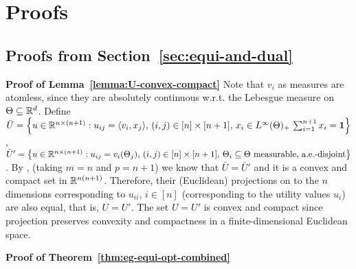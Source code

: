 
\section{Proofs} \label{app:proofs}

\subsection{Proofs from Section~\ref{sec:equi-and-dual}}
	\noindent\textbf{Proof of Lemma~\ref{lemma:U-convex-compact}}
	Note that $v_i$ as measures are atomless, since they are absolutely continuous w.r.t. the Lebesgue measure on $\Theta\subseteq \mathbb{R}^d$.
	Define\\
	$\bar{U} = \left\{ u \in \mathbb{R}^{n\times (n+1)}: u_{ij} = \langle v_i, x_j\rangle,\, (i,j)\in [n]\times [n+1],\, x_i \in L^\infty(\Theta)_+\, \sum_{i=1}^{n+1} x_i = \mathbf{1} \right\}$, \\
	$ \bar{U}' = \left\{ u \in \mathbb{R}^{n\times (n+1)}: u_{ij} = v_i(\Theta_j),\, (i,j)\in [n]\times [n+1],\, \textnormal{$\Theta_i\subseteq \Theta$ measurable, a.e.-disjoint}\right\}$.
	By \citet[Theorems 1 and 4]{dvoretzky1951relations}, (taking $m=n$ and $p=n+1$) we know that $\bar{U} = \bar{U}'$ and it is a convex and compact set in $\mathbb{R}^{n(n+1)}$.
	Therefore, their (Euclidean) projections on to the $n$ dimensions corresponding to $u_{ii}$, $i\in [n]$ (corresponding to the utility values $u_i$) are also equal, that is, 
	$U = U'$.
	The set $U=U'$ is convex and compact since projection preserves convexity and compactness in a finite-dimensional Euclidean space.

	\smallskip\noindent\textbf{Proof of Theorem~\ref{thm:eg-equi-opt-combined}}

